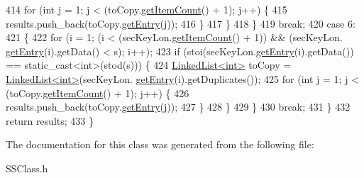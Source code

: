 \begin{DoxyCode}
414             \textcolor{keywordflow}{for} (\textcolor{keywordtype}{int} j = 1; j < (toCopy.\hyperlink{classLinkedList_afc6635f854f48f2f126cf3b60d845220}{getItemCount}() + 1); j++) \{
415                 results.push\_back(toCopy.\hyperlink{classLinkedList_a341bfd7772c9d24d29eb7a7f3936915b}{getEntry}(j));
416             \}
417         \}
418     \}
419     \textcolor{keywordflow}{break};
420     \textcolor{keywordflow}{case} 6:
421     \{
422         \textcolor{keywordflow}{for} (i = 1; (i < (secKeyLon.\hyperlink{classLinkedList_afc6635f854f48f2f126cf3b60d845220}{getItemCount}() + 1)) && (secKeyLon.
      \hyperlink{classLinkedList_a341bfd7772c9d24d29eb7a7f3936915b}{getEntry}(i).getData() < s); i++);
423         \textcolor{keywordflow}{if} (stoi(secKeyLon.\hyperlink{classLinkedList_a341bfd7772c9d24d29eb7a7f3936915b}{getEntry}(i).getData()) == static\_cast<int>(stod(s))) \{
424             \hyperlink{classLinkedList}{LinkedList<int>} toCopy = \hyperlink{classLinkedList}{LinkedList<int>}(secKeyLon.
      \hyperlink{classLinkedList_a341bfd7772c9d24d29eb7a7f3936915b}{getEntry}(i).getDuplicates());
425             \textcolor{keywordflow}{for} (\textcolor{keywordtype}{int} j = 1; j < (toCopy.\hyperlink{classLinkedList_afc6635f854f48f2f126cf3b60d845220}{getItemCount}() + 1); j++) \{
426                 results.push\_back(toCopy.\hyperlink{classLinkedList_a341bfd7772c9d24d29eb7a7f3936915b}{getEntry}(j));
427             \}
428         \}
429     \}
430     \textcolor{keywordflow}{break};
431     \}
432     \textcolor{keywordflow}{return} results;
433 \}
\end{DoxyCode}


The documentation for this class was generated from the following file\+:\begin{DoxyCompactItemize}
\item 
S\+S\+Class.\+h\end{DoxyCompactItemize}
